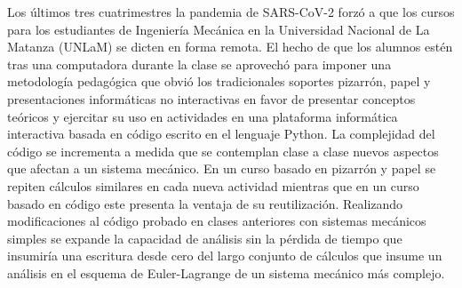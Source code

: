Los últimos tres cuatrimestres la pandemia de SARS-CoV-2 forzó a que los cursos para los estudiantes de Ingeniería Mecánica en la Universidad Nacional de La Matanza (UNLaM) se dicten en forma remota. El hecho de que los alumnos estén tras una computadora durante la clase se aprovechó para imponer una metodología pedagógica que obvió los tradicionales soportes pizarrón, papel y presentaciones informáticas no interactivas en favor de presentar conceptos teóricos y ejercitar su uso en actividades en una plataforma informática interactiva basada en código escrito en el lenguaje Python.
La complejidad del código se incrementa a medida que se contemplan clase a clase nuevos aspectos que afectan a un sistema mecánico. En un curso basado en pizarrón y papel se repiten cálculos similares en cada nueva actividad mientras que en un curso basado en código este presenta la ventaja de su reutilización. Realizando modificaciones al código probado en clases anteriores con sistemas mecánicos simples se expande la capacidad de análisis sin la pérdida de tiempo que insumiría una escritura desde cero del largo conjunto de cálculos que insume un análisis en el esquema de Euler-Lagrange de un sistema mecánico más complejo.